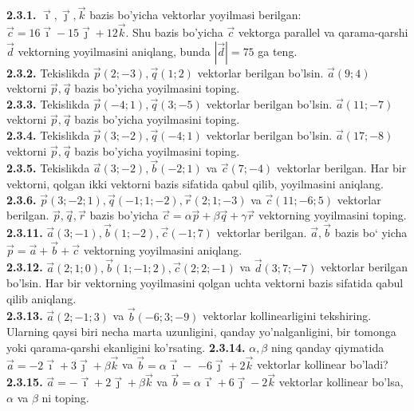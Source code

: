 \documentclass[10pt]{article}
\begin{document}
\textbf{2.3.1.} $\vec{\imath}, \vec{\jmath}, \vec{k}$ bazis bo'yicha vektorlar yoyilmasi berilgan: $\vec{c}=16 \vec{\imath}-15 \vec{\jmath}+12 \vec{k}$. Shu bazis bo'yicha $\vec{c}$ vektorga parallel va qarama-qarshi $\vec{d}$ vektorning yoyilmasini aniqlang, bunda $|\vec{d}|=75$ ga teng.\\
\textbf{2.3.2.} Tekislikda $\vec{p}(2 ;-3), \vec{q}(1 ; 2)$ vektorlar berilgan bo'lsin. $\vec{a}(9 ; 4)$ vektorni $\vec{p}, \vec{q}$ bazis bo'yicha yoyilmasini toping.\\
\textbf{2.3.3.} Tekislikda $\vec{p}(-4 ; 1), \vec{q}(3 ;-5)$ vektorlar berilgan bo'lsin. $\vec{a}(11 ;-7)$ vektorni $\vec{p}, \vec{q}$ bazis bo'yicha yoyilmasini toping.\\
\textbf{2.3.4.} Tekislikda $\vec{p}(3 ;-2), \vec{q}(-4 ; 1)$ vektorlar berilgan bo'lsin. $\vec{a}(17 ;-8)$ vektorni $\vec{p}, \vec{q}$ bazis bo'yicha yoyilmasini toping.\\
\textbf{2.3.5.} Tekislikda $\vec{a}(3 ;-2), \vec{b}(-2 ; 1)$ va $\vec{c}(7 ;-4)$ vektorlar berilgan. Har bir vektorni, qolgan ikki vektorni bazis sifatida qabul qilib, yoyilmasini aniqlang.\\
\textbf{2.3.6.} $\vec{p}(3 ;-2 ; 1), \vec{q}(-1 ; 1 ;-2), \vec{r}(2 ; 1 ;-3)$ va $\vec{c}(11 ;-6 ; 5)$ vektorlar berilgan. $\vec{p}, \vec{q}, \vec{r}$ bazis bo'yicha $\vec{c}=\alpha \vec{p}+\beta \vec{q}+\gamma \vec{r}$ vektorning yoyilmasini toping.\\
\textbf{2.3.11.} $\vec{a}(3 ;-1), \vec{b}(1 ;-2), \vec{c}(-1 ; 7)$ vektorlar berilgan. $\vec{a}, \vec{b}$ bazis bo‘ yicha $\vec{p}=\vec{a}+\vec{b}+\vec{c}$ vektorning yoyilmasini aniqlang.\\
\textbf{2.3.12.} $\vec{a}(2 ; 1 ; 0), \vec{b}(1 ;-1 ; 2), \vec{c}(2 ; 2 ;-1)$ va $\vec{d}(3 ; 7 ;-7)$ vektorlar berilgan bo'lsin. Har bir vektorning yoyilmasini qolgan uchta vektorni bazis sifatida qabul qilib aniqlang.\\
\textbf{2.3.13.} $\vec{a}(2 ;-1 ; 3)$ va $\vec{b}(-6 ; 3 ;-9)$ vektorlar kollinearligini tekshiring. Ularning qaysi biri necha marta uzunligini, qanday yo'nalganligini, bir tomonga yoki qarama-qarshi ekanligini ko'rsating. \textbf{2.3.14.} $\alpha, \beta$ ning qanday qiymatida $\vec{a}=-2 \vec{\imath}+3 \vec{\jmath}+\beta \vec{k}$ va $\vec{b}=\alpha \vec{\imath}-$ $-6 \vec{\jmath}+2 \vec{k}$ vektorlar kollinear bo'ladi?\\
\textbf{2.3.15.} $\vec{a}=-\vec{\imath}+2 \vec{\jmath}+\beta \vec{k}$ va $\vec{b}=\alpha \vec{\imath}+6 \vec{\jmath}-2 \vec{k}$ vektorlar kollinear bo'lsa, $\alpha$ va $\beta$ ni toping.\\
\end{document}
